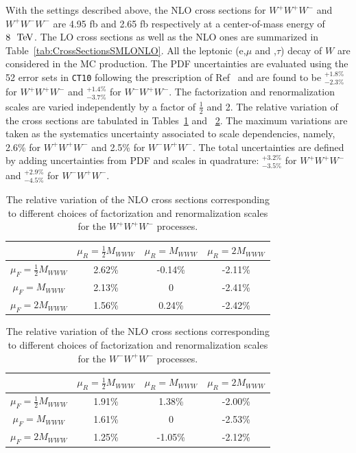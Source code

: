 With the settings described above, the NLO cross sections for
$W^+W^+W^-$ and $W^+W^-W^-$ are 4.95 fb and 2.65 fb respectively at a 
center-of-mass energy of $8~\TeV$. The LO cross sections as well as the 
NLO ones are summarized in Table~\ref{tab:CrossSectionsSMLONLO}. 
All the leptonic (e,$\mu$ and ,$\tau$) decay of $W$ are considered in 
the MC production.
The PDF uncertainties are evaluated using the 52 error sets in
\texttt{CT10} following the prescription of Ref~\cite{Lai:2010vv} and
are found to be $^{+1.8\%}_{-2.3\%}$ for $W^+W^+W^-$ and
$^{+1.4\%}_{-3.7\%}$ for $W^-W^+W^-$.  The factorization and
renormalization scales are varied independently by a factor of
$\frac{1}{2}$ and 2. The relative variation of the cross sections are
tabulated in Tables~\ref{tab:scaleVariation1} and
~\ref{tab:scaleVariation2}. The maximum variations are taken as the
systematics uncertainty associated to scale dependencies, namely, 2.6\%
for $W^+W^+W^-$ and 2.5\% for $W^-W^+W^-$. The total uncertainties are
defined by adding uncertainties from PDF and scales in quadrature:
$^{+3.2\%}_{-3.5\%}$ for $W^+W^+W^-$ and $^{+2.9\%}_{-4.5\%}$ for
$W^-W^+W^-$.

\begin{table}[ht!]
    \centering
\begin{tabular}{c|c|c|c}
\hline
     & $\mu_R=\frac{1}{2}M_{WWW}$ & $\mu_R=M_{WWW}$ &  $\mu_R=2M_{WWW}$ \\
\hline
$\mu_F=\frac{1}{2}M_{WWW}$ & 2.62\% & -0.14\% & -2.11\% \\
\hline
$\mu_F=M_{WWW}$ & 2.13\% & 0 & -2.41\% \\
\hline
$\mu_F=2M_{WWW}$ & 1.56\% & 0.24\% & -2.42\% \\
\hline
\end{tabular}
\caption{The relative variation of the NLO cross sections corresponding 
to different choices of factorization and renormalization 
scales for the $W^+W^+W^-$ processes. }
\label{tab:scaleVariation1}
\end{table}


\begin{table}[ht!]
    \centering
	
\begin{tabular}{c|c|c|c}
\hline
     & $\mu_R=\frac{1}{2}M_{WWW}$ & $\mu_R=M_{WWW}$ &  $\mu_R=2M_{WWW}$ \\
\hline
$\mu_F=\frac{1}{2}M_{WWW}$ & 1.91\% & 1.38\% & -2.00\% \\
\hline
$\mu_F=M_{WWW}$ & 1.61\% & 0 & -2.53\% \\
\hline
$\mu_F=2M_{WWW}$ & 1.25\% & -1.05\% & -2.12\% \\
\hline
\end{tabular}
\caption{The relative variation of the NLO cross sections corresponding 
to different choices of factorization and renormalization 
scales for the $W^-W^+W^-$ processes. }
\label{tab:scaleVariation2}
\end{table}



